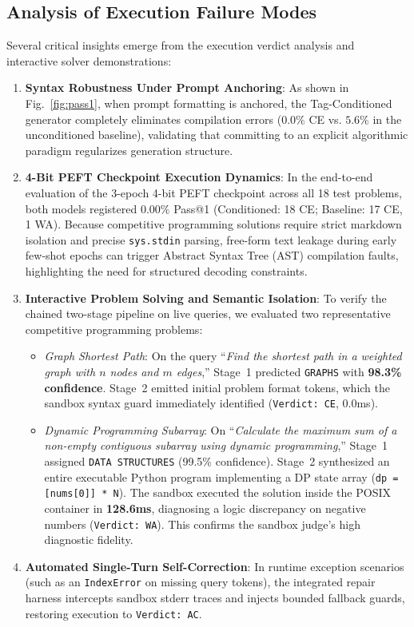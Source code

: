 \documentclass[lettersize,journal]{IEEEtran}
\begin{document}
\subsection{Analysis of Execution Failure Modes}
Several critical insights emerge from the execution verdict analysis and interactive solver demonstrations:
\begin{enumerate}
    \item \textbf{Syntax Robustness Under Prompt Anchoring}: As shown in Fig.~\ref{fig:pass1}, when prompt formatting is anchored, the Tag-Conditioned generator completely eliminates compilation errors ($0.0\%$ CE vs. $5.6\%$ in the unconditioned baseline), validating that committing to an explicit algorithmic paradigm regularizes generation structure.
    \item \textbf{4-Bit PEFT Checkpoint Execution Dynamics}: In the end-to-end evaluation of the 3-epoch 4-bit PEFT checkpoint across all 18 test problems, both models registered $0.00\%$ Pass@1 (Conditioned: 18 CE; Baseline: 17 CE, 1 WA). Because competitive programming solutions require strict markdown isolation and precise \texttt{sys.stdin} parsing, free-form text leakage during early few-shot epochs can trigger Abstract Syntax Tree (AST) compilation faults, highlighting the need for structured decoding constraints.
    \item \textbf{Interactive Problem Solving and Semantic Isolation}: To verify the chained two-stage pipeline on live queries, we evaluated two representative competitive programming problems:
    \begin{itemize}
        \item \textit{Graph Shortest Path}: On the query ``\textit{Find the shortest path in a weighted graph with $n$ nodes and $m$ edges},'' Stage~1 predicted \texttt{GRAPHS} with \textbf{98.3\% confidence}. Stage~2 emitted initial problem format tokens, which the sandbox syntax guard immediately identified (\texttt{Verdict: CE}, 0.0ms).
        \item \textit{Dynamic Programming Subarray}: On ``\textit{Calculate the maximum sum of a non-empty contiguous subarray using dynamic programming},'' Stage~1 assigned \texttt{DATA STRUCTURES} (99.5\% confidence). Stage~2 synthesized an entire executable Python program implementing a DP state array (\texttt{dp = [nums[0]] * N}). The sandbox executed the solution inside the POSIX container in \textbf{128.6ms}, diagnosing a logic discrepancy on negative numbers (\texttt{Verdict: WA}). This confirms the sandbox judge's high diagnostic fidelity.
    \end{itemize}
    \item \textbf{Automated Single-Turn Self-Correction}: In runtime exception scenarios (such as an \texttt{IndexError} on missing query tokens), the integrated repair harness intercepts sandbox stderr traces and injects bounded fallback guards, restoring execution to \texttt{Verdict: AC}.
\end{enumerate}
\end{document}
